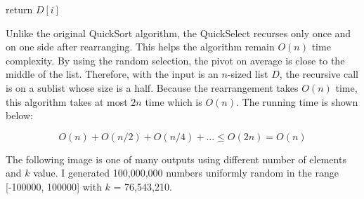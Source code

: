 \documentclass[12pt,english,]{article}
\let\origfigure\figure
\let\endorigfigure\endfigure
\renewenvironment{figure}[1][2] {
    \expandafter\origfigure\expandafter[H]
} {
    \endorigfigure
}
\begin{document}
\begin{figure}[ht]
  \centering
  \begin{minipage}{.9\linewidth}
    {\LinesNotNumbered
    \SetAlgoRefName{}
    \begin{algorithm}[H]
    \SetAlgoLined
    \BlankLine
    \centering
    \begin{minipage}{.75\linewidth}
         {
            return $D[i]$
        }
    \end{minipage}
    \caption{\textsc{KthSmallest}$(D, a, b, k)$}
    \end{algorithm}}
  \end{minipage}
\end{figure}

Unlike the original QuickSort algorithm, the QuickSelect recurses only
once and on one side after rearranging. This helps the algorithm remain
\(O(n)\) time complexity. By using the random selection, the pivot on
average is close to the middle of the list. Therefore, with the input is
an \(n\)-sized list \(D\), the recursive call is on a sublist whose size
is a half. Because the rearrangement takes \(O(n)\) time, this algorithm
takes at most \(2n\) time which is \(O(n)\). The running time is shown
below:

\[O(n) + O(n/2) + O(n/4) +... \leq O(2n) = O(n)\]

The following image is one of many outputs using different number of
elements and \(k\) value. I generated 100,000,000 numbers uniformly
random in the range {[}-100000, 100000{]} with \(k\) = 76,543,210.
\end{document}
